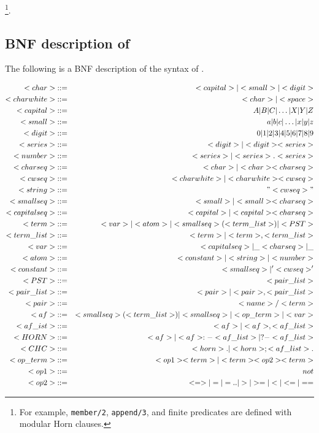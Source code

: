 \footnote{
For example, {\tt member/2}, {\tt append/3}, and finite 
predicates are defined with modular Horn clauses.}.


\subsection{BNF description of \cuprolog}
The following is a BNF description of the syntax of \cuprolog.

\begin{eqnarray*}
<char>& ::= & <capital> | <small> | <digit> \\
<charwhite> & ::= & <char> | <space>\\
<capital>& ::= & A|B|C| \ldots |X|Y|Z \\
<small>& ::= & a|b|c| \ldots |x|y|z \\
<digit>& ::= & 0|1|2|3|4|5|6|7|8|9 \\
<series> & ::= & <digit> | <digit><series> \\
<number>& ::= & <series> | <series>.<series> \\
<charseq>& ::= & <char> | <char><charseq> \\
<cwseq>& ::= & <charwhite> | <charwhite><cwseq> \\
<string>& ::= & "<cwseq>"\\
<smallseq>& ::= & <small> | <small><charseq> \\
<capitalseq>& ::= & <capital> | <capital><charseq> \\
<term>& ::= &<var> | <atom> | <smallseq>(<term\_list>) | <PST> \\
<term\_list>& ::= &<term> | <term>,<term\_list>\\
<var>& ::= &<capitalseq> | \_<charseq> | \_\\
<atom>& ::= &<constant>|<string>|<number>\\
<constant>& ::= &<smallseq> | '<cwseq>'\\
<PST>& ::= &{<pair\_list>}\\
<pair\_list>& ::= &<pair> | <pair>,<pair\_list>\\
<pair>& ::= &<name>/<term>\\ 
<af>& ::= &<smallseq>(<term\_list>) | <smallseq> | <op\_term> | <var> \\
<af\_ist>& ::= &<af> | <af>,<af\_list>\\
<HORN> & ::= & <af> | <af>:-<af\_list> | ?-<af\_list> \\
<CHC> & ::= & <horn>. | <horn>;<af\_list>. \\
<op\_term> &::= &<op1><term> | <term><op2><term>\\
<op1> &::= & not\\
<op2> &::= & <=> | = | =.. | > | >= | < | <= | == \\
\end{eqnarray*}

